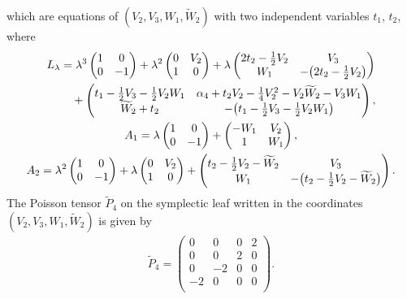 \documentclass[pdftex]{sigma}
\numberwithin{equation}{section}
\begin{document}
which are equations of $(V_2,V_3,W_1,\widetilde{W}_2)$ with two independent variables $t_1$, $t_2$, where
\begin{gather*}
L_\lambda = \lambda ^3 \left(
\begin{matrix}
1 & 0 \\
0 & -1
\end{matrix}
\right) + \lambda^2 \left(
\begin{matrix}
0 & V_2 \\
1 & 0
\end{matrix}
\right) + \lambda \left(
\begin{matrix}
2t_2-\frac{1}{2}V_2 & V_3 \\
W_1 & -\big(2t_2-\frac{1}{2}V_2\big)
\end{matrix}
\right) \\
\hphantom{L_\lambda =}{} + \left(
\begin{matrix}
t_1-\frac{1}{2}V_3-\frac{1}{2}V_2W_1 & \alpha _4 + t_2V_2 - \frac{1}{4}V_2^2 - V_2\widetilde{W}_2 - V_3W_1 \\
\widetilde{W}_2+t_2 & -\big(t_1-\frac{1}{2}V_3-\frac{1}{2}V_2W_1\big)
\end{matrix}
\right), \\
A_1 = \lambda \left(
\begin{matrix}
1 & 0 \\
0 & -1
\end{matrix}
\right) + \left(
\begin{matrix}
-W_1 & V_2 \\
1 & W_1
\end{matrix}
\right), \\
A_2 = \lambda^2 \left(
\begin{matrix}
1 & 0 \\
0 & -1
\end{matrix}
\right) + \lambda \left(
\begin{matrix}
0 & V_2 \\
1 & 0
\end{matrix}
\right) +\left(
\begin{matrix}
t_2-\frac{1}{2}V_2-\widetilde{W}_2 & V_3 \\
W_1 & -\big(t_2-\frac{1}{2}V_2-\widetilde{W}_2\big)
\end{matrix}
\right).
\end{gather*}
The Poisson tensor $\widetilde{P}_4$ on the symplectic leaf written in the coordinates $(V_2,V_3,W_1,\widetilde{W}_2)$ is given by
\begin{gather*}
\widetilde{P}_4 = \left(
\begin{matrix}
0 &0 &0 &2 \\
0&0 &2 &0 \\
0&-2 &0 &0 \\
-2&0 &0 &0 \\
\end{matrix}
\right).
\end{gather*}
\end{document}
